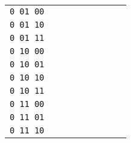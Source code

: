 \documentclass[12pt]{article}
\newenvironment{ex}[2][Exercise]{\begin{trivlist}
		\item[\hskip \labelsep {\bfseries #1}\hskip \labelsep {\bfseries #2.}]}{\end{trivlist}}
\begin{document}
\begin{ex}{2.47}
\begin{center}
\begin{tabular}{ccccccccc}
			\texttt{0 01 00} & \makebox[1cm]{\hrulefill} & \makebox[1cm]{\hrulefill} & \makebox[1cm]{\hrulefill} & \makebox[1cm]{\hrulefill} & \makebox[1cm]{\hrulefill} & \makebox[1cm]{\hrulefill} & \makebox[1cm]{\hrulefill} & \makebox[1cm]{\hrulefill} \\
			\texttt{0 01 10} & \makebox[1cm]{\hrulefill} & \makebox[1cm]{\hrulefill} & \makebox[1cm]{\hrulefill} & \makebox[1cm]{\hrulefill} & \makebox[1cm]{\hrulefill} & \makebox[1cm]{\hrulefill} & \makebox[1cm]{\hrulefill} & \makebox[1cm]{\hrulefill} \\
			\texttt{0 01 11} & \makebox[1cm]{\hrulefill} & \makebox[1cm]{\hrulefill} & \makebox[1cm]{\hrulefill} & \makebox[1cm]{\hrulefill} & \makebox[1cm]{\hrulefill} & \makebox[1cm]{\hrulefill} & \makebox[1cm]{\hrulefill} & \makebox[1cm]{\hrulefill} \\
			\texttt{0 10 00} & \makebox[1cm]{\hrulefill} & \makebox[1cm]{\hrulefill} & \makebox[1cm]{\hrulefill} & \makebox[1cm]{\hrulefill} & \makebox[1cm]{\hrulefill} & \makebox[1cm]{\hrulefill} & \makebox[1cm]{\hrulefill} & \makebox[1cm]{\hrulefill} \\
			\texttt{0 10 01} & \makebox[1cm]{\hrulefill} & \makebox[1cm]{\hrulefill} & \makebox[1cm]{\hrulefill} & \makebox[1cm]{\hrulefill} & \makebox[1cm]{\hrulefill} & \makebox[1cm]{\hrulefill} & \makebox[1cm]{\hrulefill} & \makebox[1cm]{\hrulefill} \\
			\texttt{0 10 10} & \makebox[1cm]{\hrulefill} & \makebox[1cm]{\hrulefill} & \makebox[1cm]{\hrulefill} & \makebox[1cm]{\hrulefill} & \makebox[1cm]{\hrulefill} & \makebox[1cm]{\hrulefill} & \makebox[1cm]{\hrulefill} & \makebox[1cm]{\hrulefill} \\
			\texttt{0 10 11} & \makebox[1cm]{\hrulefill} & \makebox[1cm]{\hrulefill} & \makebox[1cm]{\hrulefill} & \makebox[1cm]{\hrulefill} & \makebox[1cm]{\hrulefill} & \makebox[1cm]{\hrulefill} & \makebox[1cm]{\hrulefill} & \makebox[1cm]{\hrulefill} \\
			\texttt{0 11 00} & \makebox[1cm]{\hrulefill} & \makebox[1cm]{\hrulefill} & \makebox[1cm]{\hrulefill} & \makebox[1cm]{\hrulefill} & \makebox[1cm]{\hrulefill} & \makebox[1cm]{\hrulefill} & \makebox[1cm]{\hrulefill} & \makebox[1cm]{\hrulefill} \\
			\texttt{0 11 01} & \makebox[1cm]{\hrulefill} & \makebox[1cm]{\hrulefill} & \makebox[1cm]{\hrulefill} & \makebox[1cm]{\hrulefill} & \makebox[1cm]{\hrulefill} & \makebox[1cm]{\hrulefill} & \makebox[1cm]{\hrulefill} & \makebox[1cm]{\hrulefill} \\
			\texttt{0 11 10} & \makebox[1cm]{\hrulefill} & \makebox[1cm]{\hrulefill} & \makebox[1cm]{\hrulefill} & \makebox[1cm]{\hrulefill} & \makebox[1cm]{\hrulefill} & \makebox[1cm]{\hrulefill} & \makebox[1cm]{\hrulefill} & \makebox[1cm]{\hrulefill} \\

\end{tabular}
\end{center}
\end{ex}
\end{document}
